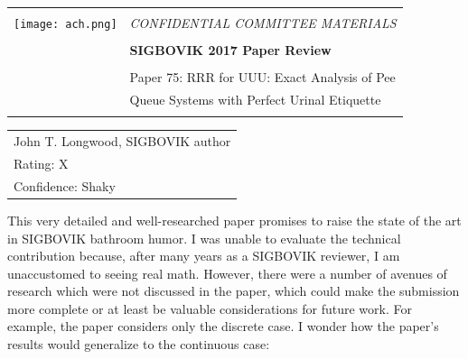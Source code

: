 \documentclass[12pt]{article}
\begin{document}
{\sffamily
\begin{tabular}{ll}
\multirow{3}{*}{\texttt{[image: ach.png]}}\\
& \Large{\em CONFIDENTIAL COMMITTEE MATERIALS} \\
&\\
& \textbf{\Huge{SIGBOVIK 2017 Paper Review}} \\
&\\
& \LARGE{Paper 75: RRR for UUU: Exact Analysis of Pee}\\
& \LARGE{Queue Systems with Perfect Urinal Etiquette} \\
&\\
\hline
\end{tabular}}
\vspace{2em}
\thispagestyle{empty}

{\large\bf
\begin{tabular}{l}
John T. Longwood, SIGBOVIK author\\
Rating: X\\
Confidence: Shaky\\
\end{tabular}}
\vspace{1em}

This very detailed and well-researched paper promises to raise the state of
the art in SIGBOVIK bathroom humor. I was unable to evaluate the technical
contribution because, after many years as a SIGBOVIK reviewer, I am unaccustomed
to seeing real math. However, there were a number of avenues of research
which were not discussed in the paper, which could make the submission more
complete or at least be valuable considerations for future work. For example,
the paper considers only the discrete case. I wonder how the paper's results
would generalize to the continuous case:

\end{document}
